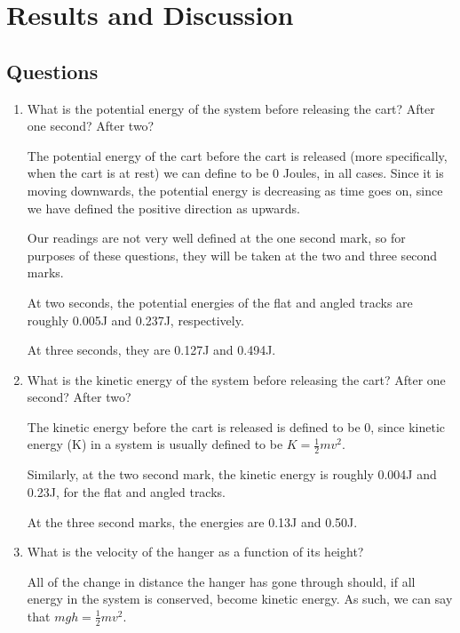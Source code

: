 \section{Results and Discussion}

\subsection{Questions}

\begin{enumerate}

\item What is the potential energy of the system before releasing the cart? After one second? After two?

The potential energy of the cart before the cart is released (more specifically, when the cart is at rest) we can define to be 0 Joules, in all cases.
Since it is moving downwards, the potential energy is decreasing as time goes on, since we have defined the positive direction as upwards.

Our readings are not very well defined at the one second mark, so for purposes of these questions, they will be taken at the two and three second marks.

At two seconds, the potential energies of the flat and angled tracks are roughly 0.005J and 0.237J, respectively.

At three seconds, they are 0.127J and 0.494J.

\item What is the kinetic energy of the system before releasing the cart? After one second? After two?

The kinetic energy before the cart is released is defined to be 0, since kinetic energy (K) in a system is usually defined to be \begin{math}K = \frac{1}{2}mv^2\end{math}.

Similarly, at the two second mark, the kinetic energy is roughly 0.004J and 0.23J, for the flat and angled tracks.

At the three second marks, the energies are 0.13J and 0.50J.

\item What is the velocity of the hanger as a function of its height?

All of the change in distance the hanger has gone through should, if all energy in the system is conserved, become kinetic energy.
As such, we can say that \begin{math}mgh = \frac{1}{2}mv^2\end{math}.


\end{enumerate}
